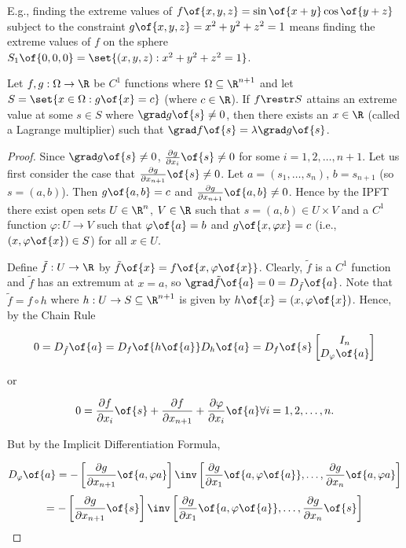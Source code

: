E.g., finding the extreme values of $f\of{x,y,z} = \sin\of{x+y} \cos\of{y+z}$ subject to the constraint $g\of{x,y,z} = x^2 + y^2 + z^2 = 1$ means finding the extreme values of $f$ on the sphere $S_1\of{0,0,0} = \set{(x,y,z): x^2 + y^2 + z^2 = 1}$.

\begin{theorem}
    Let $f,g: \Omega \to \R$ be $C^1$ functions where $\Omega \subseteq \R^{n+1}$ and let $S = \set{x \in \Omega: g\of{x} = c}$ (where $c \in \R$). If $f \restr S$ attains an extreme value at some $s \in S$ where $\grad g\of{s} \neq 0$, then there exists an $x \in \R$ (called a Lagrange multiplier) such that $\grad f\of{s} = \lambda \grad g\of{s}$.
\end{theorem}
\begin{proof}
    Since $\grad g\of{s} \neq 0$, $\frac{\partial g}{\partial x_i}\of{s} \neq 0$ for some $i = 1, 2, \dots, n + 1$. Let us first consider the case that $\frac{\partial g}{\partial x_{n+1}}\of{s} \neq 0$. Let $a = (s_1, \dots, s_n)$, $b= s_{n+1}$ (so $s = (a,b)$). Then $g\of{a,b} = c$ and $\frac{\partial g}{\partial x_{n+1}}\of{a,b} \neq 0$. Hence by the IPFT there exist open sets $U \in \R^n$, $V \in \R$ such that $s = (a,b) \in U \times V$ and a $C^1$ function $\varphi: U \to V$ such that $\varphi\of{a} = b$ and $g\of{x, \varphi{x}} = c$ (i.e., $(x, \varphi\of{x}) \in S$) for all $x \in U$.

    Define $\tilde{f}: U \to \R$ by $\tilde{f}\of{x} = f\of{x, \varphi\of{x}}$. Clearly, $\tilde{f}$ is a $C^1$ function and $\tilde{f}$ has an extremum at $x = a$, so $\grad \tilde{f}\of{a} = 0 = D_{\tilde{f}}\of{a}$. Note that $\tilde{f} = f \circ h$ where $h: U \to S \subseteq \R^{n+1}$ is given by $h\of{x} = (x, \varphi\of{x})$. Hence, by the Chain Rule

    \[0 = D_{\tilde{f}}\of{a} = D_f\of{h\of{a}} D_h\of{a} = D_f\of{s} \begin{bmatrix} I_n \\ D_\varphi\of{a} \end{bmatrix}\]

    or
    
    \[0 = \frac{\partial f}{\partial x_i}\of{s} + \frac{\partial f}{\partial x_{n+1}} + \frac{\partial \varphi}{\partial x_i}\of{a} \forall i = 1, 2, \dots, n.\]

    But by the Implicit Differentiation Formula,

    \[D_\varphi\of{a} = -\left[\frac{\partial g}{\partial x_{n+1}}\of{a, \varphi{a}}\right]\inv \left[\frac{\partial g}{\partial x_1}\of{a, \varphi\of{a}}, \dots, \frac{\partial g}{\partial x_n}\of{a, \varphi{a}} \right]\]
    \[= -\left[\frac{\partial g}{\partial x_{n+1}}\of{s}\right]\inv \left[\frac{\partial g}{\partial x_1}\of{a, \varphi\of{a}}, \dots, \frac{\partial g}{\partial x_n}\of{s} \right]\]


\end{proof}
